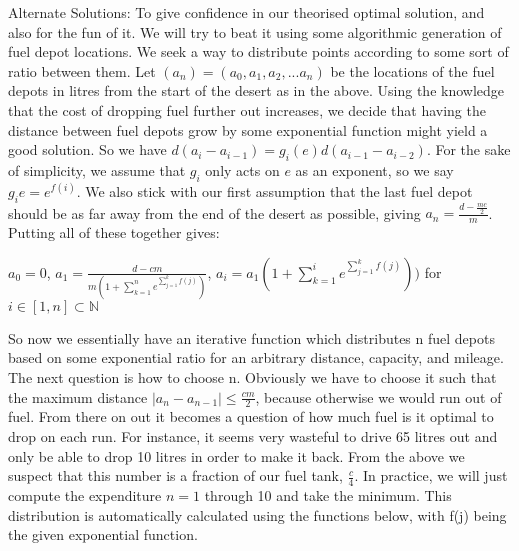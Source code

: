 \documentclass{homework}
\newcommand*{\N}{\mathbb N}
\begin{document}
\newpage
Alternate Solutions:
\newline\newline
To give confidence in our theorised optimal solution, and also for the fun of it. We will try to beat it using some algorithmic generation of fuel depot locations.
\newline\newline
We seek a way to distribute points according to some sort of ratio between them. 
\newline\newline
Let $(a_n) = (a_0, a_1, a_2, ...a_n)$ be the locations of the fuel depots in litres from the start of the desert as in the above.
\newline\newline
Using the knowledge that the cost of dropping fuel further out increases, we decide that having the distance between fuel depots grow by some exponential function might yield a good solution. So we have $d(a_i - a_{i-1}) = g_i(e)d(a_{i-1} - a_{i-2})$. For the sake of simplicity, we assume that $g_i$ only acts on $e$ as an exponent, so we say $g_i{e} = e^{f(i)}$. We also stick with our first assumption that the last fuel depot should be as far away from the end of the desert as possible, giving $a_n = \frac{d - \frac{mc}{2}}{m}$. Putting all of these together gives: \newline
\begin{center}
    \large $a_0 = 0$,
    \newline\newline 
    \large $a_1 = \frac{d-cm}{m(1 + \sum_{k=1}^{n}e^{\sum_{j=1}^{k}f(j)})}$,
    \newline\newline \newline
    \large $a_i = a_1(1 + \sum_{k=1}^{i}e^{\sum_{j=1}^{k}f(j)}))$ for $i \in [1,n]\subset\N$
\end{center}
So now we essentially have an iterative function which distributes n fuel depots based on some exponential ratio for an arbitrary distance, capacity, and mileage. 
\newline\newline
The next question is how to choose n. Obviously we have to choose it such that the maximum distance $|a_n - a_{n-1}| \le \frac{cm}{2}$, because otherwise we would run out of fuel. From there on out it becomes a question of how much fuel is it optimal to drop on each run. For instance, it seems very wasteful to drive 65 litres out and only be able to drop 10 litres in order to make it back. From the above we suspect that this number is a fraction of our fuel tank, $\frac{c}{4}$. In practice, we will just compute the expenditure $n = 1$ through 10 and take the minimum.
\newline\newline
This distribution is automatically calculated using the functions below, with f(j) being the given exponential function.
\end{document}
